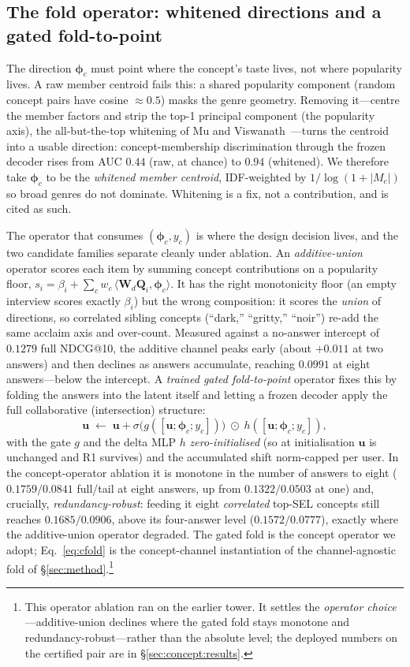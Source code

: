 \documentclass[11pt]{article}
\newcommand{\Q}{\mathbf{Q}}
\newcommand{\uu}{\mathbf{u}}
\newcommand{\W}{\mathbf{W}}
\newcommand{\bphi}{\boldsymbol{\phi}}
\begin{document}
\subsection{The fold operator: whitened directions and a gated fold-to-point}\label{sec:concept:fold}

The direction $\bphi_c$ must point where the concept's taste lives, not where popularity lives. A raw member centroid
fails this: a shared popularity component (random concept pairs have cosine $\approx 0.5$) masks the genre geometry.
Removing it---centre the member factors and strip the top-1 principal component (the popularity axis), the
all-but-the-top whitening of Mu and Viswanath~\cite{mu2018allbutthetop}---turns the centroid into a usable direction: concept-membership
discrimination through the frozen decoder rises from AUC $0.44$ (raw, at chance) to $0.94$ (whitened). We therefore
take $\bphi_c$ to be the \emph{whitened member centroid}, IDF-weighted by $1/\log(1+|M_c|)$ so broad genres do not
dominate. Whitening is a fix, not a contribution, and is cited as such.

The operator that consumes $(\bphi_c,y_c)$ is where the design decision lives, and the two candidate families
separate cleanly under ablation. An \emph{additive-union} operator scores each item by summing concept contributions on
a popularity floor, $s_i=\beta_i+\sum_c w_c\,\langle \W_d\Q_i,\bphi_c\rangle$. It has the right monotonicity floor (an
empty interview scores exactly $\beta_i$) but the wrong composition: it scores the \emph{union} of directions, so
correlated sibling concepts (``dark,'' ``gritty,'' ``noir'') re-add the same acclaim axis and over-count. Measured
against a no-answer intercept of $0.1279$ full NDCG@10, the additive channel peaks early (about $+0.011$ at two
answers) and then declines as answers accumulate, reaching $0.0991$ at eight answers---below the intercept. A
\emph{trained gated fold-to-point} operator fixes this by folding the answers into the latent itself and letting a
frozen decoder apply the full collaborative (intersection) structure:
\begin{equation}\label{eq:cfold}
  \uu \;\leftarrow\; \uu + \sigma\!\bigl(g([\uu;\bphi_c;y_c])\bigr)\;\odot\;h([\uu;\bphi_c;y_c]),
\end{equation}
with the gate $g$ and the delta MLP $h$ \emph{zero-initialised} (so at initialisation $\uu$ is unchanged and R1
survives) and the accumulated shift norm-capped per user. In the concept-operator ablation it is monotone in the number of answers to eight
($0.1759/0.0841$ full/tail at eight answers, up from $0.1322/0.0503$ at one) and, crucially,
\emph{redundancy-robust}: feeding it eight \emph{correlated} top-SEL concepts still reaches $0.1685/0.0906$,
above its four-answer level ($0.1572/0.0777$), exactly where the additive-union operator degraded. The gated fold is the concept operator we adopt;
Eq.~\eqref{eq:cfold} is the concept-channel instantiation of the channel-agnostic fold of \S\ref{sec:method}.\footnote{This
operator ablation ran on the earlier tower. It settles the \emph{operator choice}---additive-union declines
where the gated fold stays monotone and redundancy-robust---rather than the absolute level; the deployed
numbers on the certified pair are in \S\ref{sec:concept:results}.}
\end{document}
